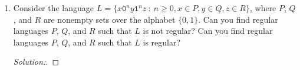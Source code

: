 \documentclass[10pt]{article}
\begin{document}
\begin{enumerate}[1)]
\begin{enumerate}[a)]
\item
$f(L) = \{w: \exists x \in L\ (w = x\texttt{00})\}$.
\begin{proof}[Answer:]
\end{proof}
\begin{proof}[Proof:]
\end{proof}
\end{enumerate}


\item
Consider the language $L = \{x\texttt{0}^ny\texttt{1}^nz\ :\ n \geq 0, x \in P, y \in Q, z \in R\}$, where $P$, $Q$, and $R$ are nonempty sets over the alphabet $\{0, 1\}$.  Can you find regular languages $P$, $Q$, and $R$ such that $L$ is not regular?  Can you find regular languages $P$, $Q$, and $R$ such that $L$ is regular?
\begin{proof}[Solution:]
\end{proof}
\end{enumerate}
\end{document}
